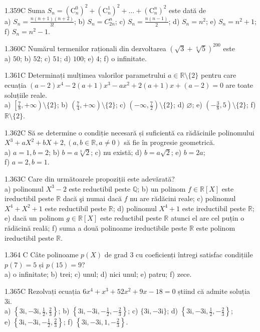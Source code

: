 \documentclass[11pt]{article}
\begin{document}
1.359C Suma $S_{n}=\left(\mathrm{C}_{n}^{0}\right)^{2}+\left(\mathrm{C}_{n}^{1}\right)^{2}+\ldots+\left(\mathrm{C}_{n}^{n}\right)^{2}$ este dată de\\ a) $S_{n}=\frac{n(n+1)(n+2)}{3!}$; b) $S_{n}=C_{2 n}^{n}$; c) $S_{n}=\frac{n(n-1)}{2}$; d) $S_{n}=n^{2}$; e) $S_{n}=n^{2}+1$; f) $S_{n}=n^{2}-1$.

1.360C Numărul termenilor raționali din dezvoltarea $(\sqrt{3}+\sqrt[4]{5})^{200}$ este\\ a) $50$; b) $52$; c) $51$; d) $100$; e) $4$; f) o infinitate.

1.361C Determinați mulțimea valorilor parametrului $a \in \mathbb{R} \setminus\{2\}$ pentru care ecuația $(a-2) x^{4}-2(a+1) x^{3}-a x^{2}+2(a+1) x+(a-2)=0$ are toate soluțiile reale.\\ a) $\left[\frac{7}{8},+\infty\right) \setminus\{2\}$; b) $\left(\frac{7}{4},+\infty\right) \setminus\{2\}$; c) $\left(-\infty, \frac{7}{2}\right) \setminus\{2\}$; d) $\varnothing$; e) $\left(-\frac{3}{8}, 5\right) \setminus\{2\}$; f) $\mathbb{R} \setminus\{2\}$.

1.362C Să se determine o condiție necesară și suficientă ca rădăcinile polinomului $X^{3}+a X^{2}+b X+2,(a, b \in \mathbb{R}, a \neq 0)$ să fie în progresie geometrică.\\ a) $a=1, b=2$; b) $b=a \sqrt[3]{2}$; c) nu există; d) $b=a \sqrt{2}$; e) $b=2 a$;\\ f) $a=2, b=1$.

1.363C Care din următoarele propoziții este adevărată?\\ a) polinomul $X^{3}-2$ este reductibil peste $\mathbb{Q}$; b) un polinom $f \in \mathbb{R}[X]$ este ireductibil peste $\mathbb{R}$ dacă şi numai dacă $f$ nu are rădăcini reale; c) polinomul $X^{4}+X^{2}+1$ este reductibil peste $\mathbb{R}$; d) polinomul $X^{4}+1$ este ireductibil peste $\mathbb{R}$; e) dacă un polinom $g \in \mathbb{R}[X]$ este reductibil peste $\mathbb{R}$ atunci el are cel puțin o rădăcină reală; f) suma a două polinoame ireductibile peste $\mathbb{R}$ este polinom ireductibil peste $\mathbb{R}$.

1.364 C Câte polinoame $p(X)$ de grad 3 cu coeficienți întregi satisfac condițiile $p(7)=5$ și $p(15)=9$?\\ a) o infinitate; b) trei; c) unul; d) nici unul; e) patru; f) zece.

1.365C Rezolvați ecuația $6 x^{4}+x^{3}+52 x^{2}+9 x-18=0$ știind că admite soluția $3 \mathrm{i}$.\\ a) $\left\{3 \mathrm{i},-3 \mathrm{i}, \frac{1}{2}, \frac{2}{3}\right\}$; b) $\left\{3 \mathrm{i},-3 \mathrm{i},-\frac{1}{2},-\frac{2}{3}\right\}$; c) $\{3 \mathrm{i},-3 \mathrm{i}\}$; d) $\left\{3 \mathrm{i},-3 \mathrm{i}, \frac{1}{2},-\frac{2}{3}\right\}$;\\ e) $\left\{3 \mathrm{i},-3 \mathrm{i},-\frac{1}{2}, \frac{2}{3}\right\}$; f) $\left\{3 \mathrm{i},-3 \mathrm{i}, 1,-\frac{2}{3}\right\}$.
\end{document}
